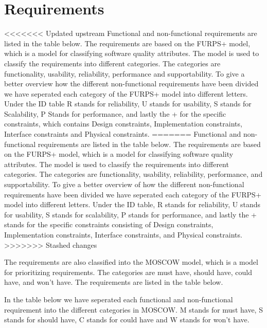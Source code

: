 
\section{Requirements}

<<<<<<< Updated upstream
Functional and non-functional\cite{example} requirements are listed in the table below. The requirements are based on the FURPS+ model, which is a model for classifying software quality attributes. The model is used to classify the requirements into different categories. The categories are functionality, usability, reliability, performance and supportability.
To give a better overview how the different non-functional requirements have been divided we have seperated each category of the FURPS+ model into different letters. Under the ID table R stands for reliability, U stands for usability, S stands for Scalability, P Stands for performance, and lastly the + for the specific constraints, which contains Design constraints, Implementation constraints, Interface constraints and Physical constraints. \newline
=======
Functional and non-functional\cite{example} requirements are listed in the table below. The requirements are based on the FURPS+ model, which is a model for classifying software quality attributes. The model is used to classify the requirements into different categories. The categories are functionality, usability, reliability, performance, and supportability.
To give a better overview of how the different non-functional requirements have been divided we have seperated each category of the FURPS+ model into different letters. Under the ID table, R stands for reliability, U stands for usability, S stands for scalability, P stands for performance, and lastly the + stands for the specific constraints consisting of Design constraints, Implementation constraints, Interface constraints, and Physical constraints. \newline
>>>>>>> Stashed changes

The requirements are also classified into the MOSCOW model, which is a model for prioritizing requirements. The categories are must have, should have, could have, and won't have. The requirements are listed in the table below. \newline

In the table below we have seperated each functional and non-functional requirement into the different categories in MOSCOW. M stands for must have, S stands for should have, C stands for could have and W stands for won't have.\newline

